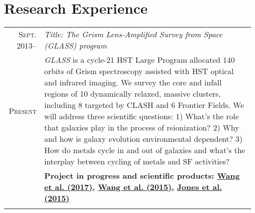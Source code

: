 \documentclass[letterpaper,10pt]{article}
\begin{document}
\section{Research Experience}
\vspace{-1ex}
\begin{longtable}{r|p{5.5in}}
  \textsc{Sept. 2013}--  &   \emph{Title: The Grism Lens-Amplified Survey from Space (GLASS) program}   \\
  \textsc{Present}       &   \small{\textit{GLASS} is a cycle-21 HST Large Program allocated 140 orbits of Grism spectroscopy
  assisted with HST optical and infrared imaging. We survey the core and infall regions of 10 dynamically relaxed, massive
  clusters, including 8 targeted by CLASH and 6 Frontier Fields. We will address three scientific questions: 1) What's the role that
  galaxies play in the process of reionization? 2) Why and how is galaxy evolution environmental dependent? 3) How do metals cycle
  in and out of galaxies and what's the interplay between cycling of metals and SF activities?}   \\
  & \textbf{Project in progress and scientific products: 
        \hyperlink{17.wang.apj}{Wang et al. (2017)},
        \hyperlink{15.wang.apj}{Wang et al. (2015)},
        \hyperlink{15.jones.aj}{Jones et al. (2015)}} \\
  \multicolumn{2}{c}{} \\

\end{longtable}
\end{document}
